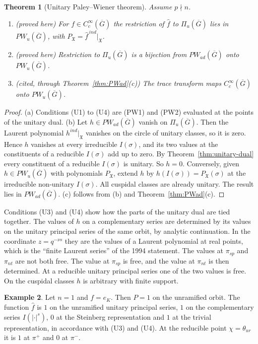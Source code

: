 \documentclass[12pt,letterpaper]{article}
\numberwithin{equation}{section}
\newtheorem{theorem}{Theorem}[section]
\theoremstyle{definition}
\newtheorem{xexample}[theorem]{Example}
\newcommand{\proved}{proved here}
\newcommand{\cited}{cited}
\newcommand{\bG}{\overline{G}}
\newcommand{\fX}{\mathfrak X}
\newcommand{\Piu}{\Pi_{u}(\bG)}
\begin{document}
\begin{theorem}[Unitary Paley--Wiener theorem]\label{thm:PWu}
Assume $p\nmid n$.
\begin{enumerate}[label=(\alph*),leftmargin=*,itemsep=1pt]
\item (\proved) For $f\in C_c^\infty(\bG)$ the restriction of $\hat f$ to $\Piu$ lies in
$PW_u(\bG)$, with $P_{\fX}=\hat f^{\,ind}|_{\fX}$.
\item (\proved) Restriction to $\Piu$ is a bijection from $PW_{ad}(\bG)$ onto $PW_u(\bG)$.
\item (\cited, through Theorem~\ref{thm:PWad}(c)) The trace transform maps
$C_c^\infty(\bG)$ onto $PW_u(\bG)$.
\end{enumerate}
\end{theorem}
\begin{proof}
(a) Conditions (U1) to (U4) are (PW1) and (PW2) evaluated at the points of the unitary
dual.  (b) Let $h\in PW_{ad}(\bG)$ vanish on $\Piu$.  Then the Laurent polynomial
$h^{ind}|_{\fX}$ vanishes on the circle of unitary classes, so it is zero.  Hence $h$
vanishes at every irreducible $I(\sigma)$, and its two values at the constituents of a
reducible $I(\sigma)$ add up to zero.  By Theorem~\ref{thm:unitary-dual} every constituent
of a reducible $I(\sigma)$ is unitary.  So $h=0$.  Conversely, given $h\in PW_u(\bG)$ with
polynomials $P_{\fX}$, extend $h$ by $h(I(\sigma))=P_{\fX}(\sigma)$ at the irreducible
non-unitary $I(\sigma)$. All cuspidal classes are already unitary. The result lies in
$PW_{ad}(\bG)$.  (c) follows from (b) and Theorem~\ref{thm:PWad}(c).
\end{proof}

Conditions (U3) and (U4) show how the parts of the unitary dual are tied together.  The
values of $h$ on a complementary series are determined by its values on the unitary
principal series of the same orbit, by analytic continuation.  In the coordinate
$z=q^{-\nu s}$ they are the values of a Laurent polynomial at real points, which is the
``finite Laurent series'' of the 1994 statement.  The values at $\pi_{sp}$ and $\pi_{nt}$
are not both free.  The value at $\pi_{sp}$ is free, and the value at $\pi_{nt}$ is then
determined.  At a reducible unitary principal series one of the two values is free.  On
the cuspidal classes $h$ is arbitrary with finite support.

\begin{xexample}\label{ex:PWu}
Let $n=1$ and $f=e_K$.  Then $P=1$ on the unramified orbit.  The function $\hat f$ is $1$
on the unramified unitary principal series, $1$ on the complementary series $I(|\cdot|^s)$,
$0$ at the Steinberg representation and $1$ at the trivial representation, in accordance
with (U3) and (U4).  At the reducible point $\chi=\theta_{ur}$ it is $1$ at $\pi^+$ and
$0$ at $\pi^-$.
\end{xexample}
\end{document}
